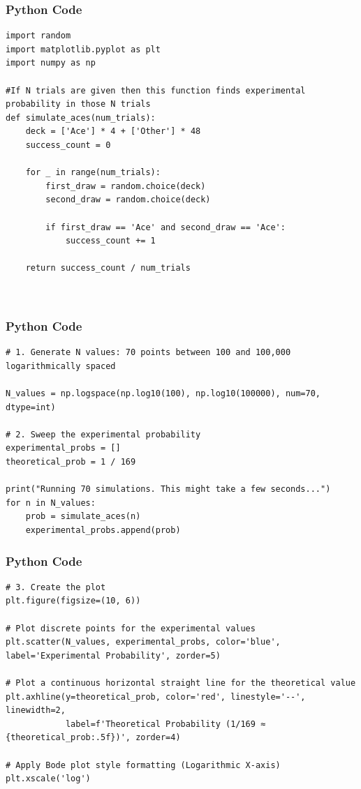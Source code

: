 \documentclass{beamer}
\begin{document}
\begin{frame}[fragile]
    \frametitle{Python Code}
    \begin{lstlisting}
import random
import matplotlib.pyplot as plt
import numpy as np

#If N trials are given then this function finds experimental probability in those N trials
def simulate_aces(num_trials):
    deck = ['Ace'] * 4 + ['Other'] * 48
    success_count = 0
    
    for _ in range(num_trials):
        first_draw = random.choice(deck)
        second_draw = random.choice(deck)
        
        if first_draw == 'Ace' and second_draw == 'Ace':
            success_count += 1
            
    return success_count / num_trials



\end{lstlisting}
\end{frame}

\begin{frame}[fragile]
    \frametitle{Python Code }
    \begin{lstlisting}
# 1. Generate N values: 70 points between 100 and 100,000 logarithmically spaced

N_values = np.logspace(np.log10(100), np.log10(100000), num=70, dtype=int)

# 2. Sweep the experimental probability
experimental_probs = []
theoretical_prob = 1 / 169

print("Running 70 simulations. This might take a few seconds...")
for n in N_values:
    prob = simulate_aces(n)
    experimental_probs.append(prob)

\end{lstlisting}
\end{frame}

\begin{frame}[fragile]
    \frametitle{Python Code }
    \begin{lstlisting}
# 3. Create the plot
plt.figure(figsize=(10, 6))

# Plot discrete points for the experimental values
plt.scatter(N_values, experimental_probs, color='blue', label='Experimental Probability', zorder=5)

# Plot a continuous horizontal straight line for the theoretical value
plt.axhline(y=theoretical_prob, color='red', linestyle='--', linewidth=2, 
            label=f'Theoretical Probability (1/169 ≈ {theoretical_prob:.5f})', zorder=4)

# Apply Bode plot style formatting (Logarithmic X-axis)
plt.xscale('log')

\end{lstlisting}
\end{frame}
\end{document}
